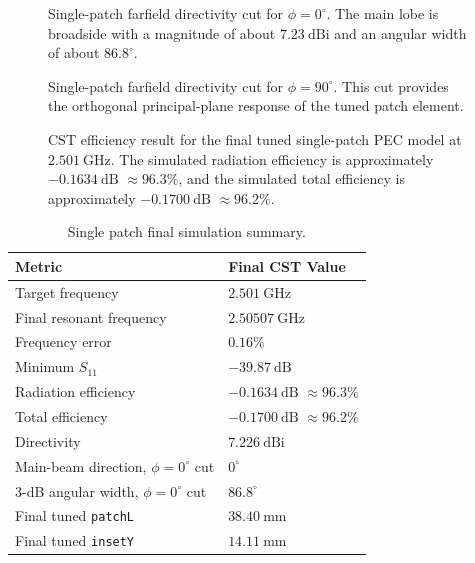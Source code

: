 \begin{figure}[H]
    \centering
    \caption{Single-patch farfield directivity cut for \(\phi=0^\circ\).  The main lobe is broadside with a magnitude of about \(7.23~\mathrm{dBi}\) and an angular width of about \(86.8^\circ\).}
    \label{fig:single-patch-phi0}
\end{figure}

\begin{figure}[H]
    \centering
    \caption{Single-patch farfield directivity cut for \(\phi=90^\circ\).  This cut provides the orthogonal principal-plane response of the tuned patch element.}
    \label{fig:single-patch-phi90}
\end{figure}

\begin{figure}[H]
    \centering
    \caption[Efficiency of the final tuned single-patch PEC model.]{CST efficiency result for the final tuned single-patch PEC model at \(2.501~\mathrm{GHz}\). The simulated radiation efficiency is approximately \(-0.1634~\mathrm{dB}\) \(\approx96.3\%\), and the simulated total efficiency is approximately \(-0.1700~\mathrm{dB}\) \(\approx96.2\%\).}
    \label{fig:single-patch-efficiency}
\end{figure}

\begin{table}[H]
\centering
\caption{Single patch final simulation summary.}
\label{tab:single-patch-final-summary}
\begin{tabular}{@{}ll@{}}
\toprule
\textbf{Metric} & \textbf{Final CST Value} \\
\midrule
Target frequency & \(2.501~\mathrm{GHz}\) \\
Final resonant frequency & \(2.50507~\mathrm{GHz}\) \\
Frequency error & \(0.16\%\) \\
Minimum \(S_{11}\) & \(-39.87~\mathrm{dB}\) \\
Radiation efficiency & \(-0.1634~\mathrm{dB}\) \(\approx 96.3\%\) \\
Total efficiency & \(-0.1700~\mathrm{dB}\) \(\approx 96.2\%\) \\
Directivity & \(7.226~\mathrm{dBi}\) \\
Main-beam direction, \(\phi=0^\circ\) cut & \(0^\circ\) \\
3-dB angular width, \(\phi=0^\circ\) cut & \(86.8^\circ\) \\
Final tuned \texttt{patchL} & \(38.40~\mathrm{mm}\) \\
Final tuned \texttt{insetY} & \(14.11~\mathrm{mm}\) \\
\bottomrule
\end{tabular}
\end{table}

